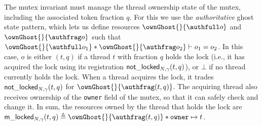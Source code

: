 The mutex invariant must manage the thread ownership state of the mutex, including the associated token fraction $q$. For this we use the \emph{authoritative} ghost state pattern, which lets us define resources $\ownGhost{}{\authfull o}$ and $\ownGhost{}{\authfrag o}$ such that $\ownGhost{}{\authfull o_1} \ast \ownGhost{}{\authfrag o_2} \vdash o_1 = o_2$. In this case, $o$ is either $(t, q)$ if a thread $t$ with fraction $q$ holds the lock (i.e., it has acquired the lock using its registration $\mathsf{not\_locked}_{N, \gamma}(t, q)$), or $\bot$ if no thread currently holds the lock. When a thread acquires the lock, it trades $\mathsf{not\_locked}_{N, \gamma}(t, q)$ for $\ownGhost{}{\authfrag (t, q)}$. The acquiring thread also receives ownership of the \lstinline{owner} field of the mutex, so that it can safely check and change it. In sum, the resources owned by the thread that holds the lock are $\locked{N, \gamma}{t}{q} \triangleq \ownGhost{}{\authfrag (t, q)} \ast \texttt{owner} \mapsto t$.


